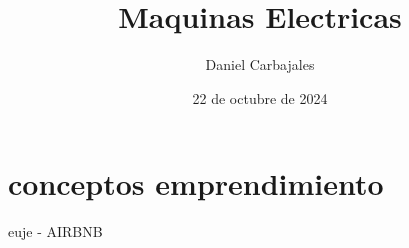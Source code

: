 \documentclass{report}
\title{\Huge{Maquinas Electricas}}
\author{\large{Daniel Carbajales}}
\date{22 de octubre de 2024}
\begin{document}


\label{chapter:Tema_1}  %
\section{}\label{sec:}

\subsection{}\label{subsec:}

\label{chapter:Tema_2}
\section{conceptos emprendimiento}
\begin{enumerate}
euje - AIRBNB
\end{enumerate}
\end{document}
